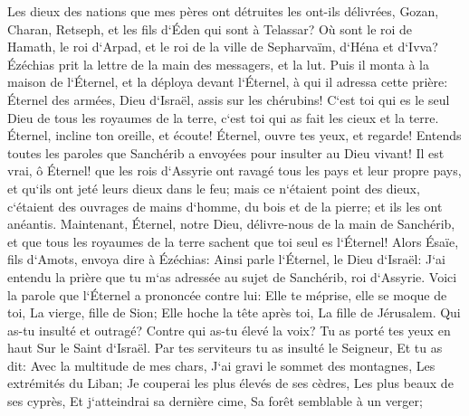 \verse Les dieux des nations que mes pères ont détruites les ont-ils délivrées, Gozan, Charan, Retseph, et les fils d`Éden qui sont à Telassar? 
\verse Où sont le roi de Hamath, le roi d`Arpad, et le roi de la ville de Sepharvaïm, d`Héna et d`Ivva? 
\verse Ézéchias prit la lettre de la main des messagers, et la lut. Puis il monta à la maison de l`Éternel, et la déploya devant l`Éternel, 
\verse à qui il adressa cette prière: 
\verse Éternel des armées, Dieu d`Israël, assis sur les chérubins! C`est toi qui es le seul Dieu de tous les royaumes de la terre, c`est toi qui as fait les cieux et la terre. 
\verse Éternel, incline ton oreille, et écoute! Éternel, ouvre tes yeux, et regarde! Entends toutes les paroles que Sanchérib a envoyées pour insulter au Dieu vivant! 
\verse Il est vrai, ô Éternel! que les rois d`Assyrie ont ravagé tous les pays et leur propre pays, 
\verse et qu`ils ont jeté leurs dieux dans le feu; mais ce n`étaient point des dieux, c`étaient des ouvrages de mains d`homme, du bois et de la pierre; et ils les ont anéantis. 
\verse Maintenant, Éternel, notre Dieu, délivre-nous de la main de Sanchérib, et que tous les royaumes de la terre sachent que toi seul es l`Éternel! 
\verse Alors Ésaïe, fils d`Amots, envoya dire à Ézéchias: Ainsi parle l`Éternel, le Dieu d`Israël: J`ai entendu la prière que tu m`as adressée au sujet de Sanchérib, roi d`Assyrie. 
\verse Voici la parole que l`Éternel a prononcée contre lui: Elle te méprise, elle se moque de toi, La vierge, fille de Sion; Elle hoche la tête après toi, La fille de Jérusalem. 
\verse Qui as-tu insulté et outragé? Contre qui as-tu élevé la voix? Tu as porté tes yeux en haut Sur le Saint d`Israël. 
\verse Par tes serviteurs tu as insulté le Seigneur, Et tu as dit: Avec la multitude de mes chars, J`ai gravi le sommet des montagnes, Les extrémités du Liban; Je couperai les plus élevés de ses cèdres, Les plus beaux de ses cyprès, Et j`atteindrai sa dernière cime, Sa forêt semblable à un verger; 
